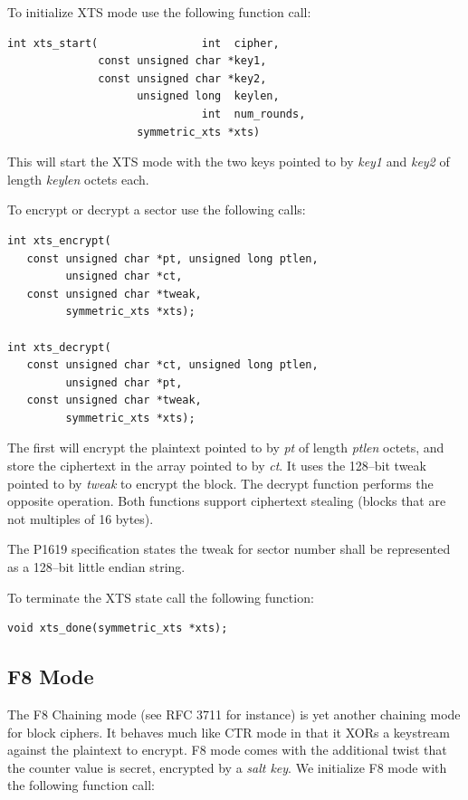 \documentclass[synpaper]{book}
\begin{document}
To initialize XTS mode use the following function call:

\begin{verbatim}
int xts_start(                int  cipher,
              const unsigned char *key1,
              const unsigned char *key2,
                    unsigned long  keylen,
                              int  num_rounds,
                    symmetric_xts *xts)
\end{verbatim}
This will start the XTS mode with the two keys pointed to by \textit{key1} and \textit{key2} of length \textit{keylen} octets each.

To encrypt or decrypt a sector use the following calls:

 
\begin{verbatim}
int xts_encrypt(
   const unsigned char *pt, unsigned long ptlen,
         unsigned char *ct,
   const unsigned char *tweak,
         symmetric_xts *xts);

int xts_decrypt(
   const unsigned char *ct, unsigned long ptlen,
         unsigned char *pt,
   const unsigned char *tweak,
         symmetric_xts *xts);
\end{verbatim}
The first will encrypt the plaintext pointed to by \textit{pt} of length \textit{ptlen} octets, and store the ciphertext in the array pointed to by
\textit{ct}.  It uses the 128--bit tweak pointed to by \textit{tweak} to encrypt the block.  The decrypt function performs the opposite operation.  Both
functions support ciphertext stealing (blocks that are not multiples of 16 bytes).

The P1619 specification states the tweak for sector number shall be represented as a 128--bit little endian string.

To terminate the XTS state call the following function:

\begin{verbatim}
void xts_done(symmetric_xts *xts);
\end{verbatim}


\subsection{F8 Mode}
The F8 Chaining mode (see RFC 3711 for instance) is yet another chaining mode for block ciphers.  It behaves much like CTR mode in that it XORs a keystream
against the plaintext to encrypt.  F8 mode comes with the additional twist that the counter value is secret, encrypted by a \textit{salt key}.  We
initialize F8 mode with the following function call:
\end{document}
